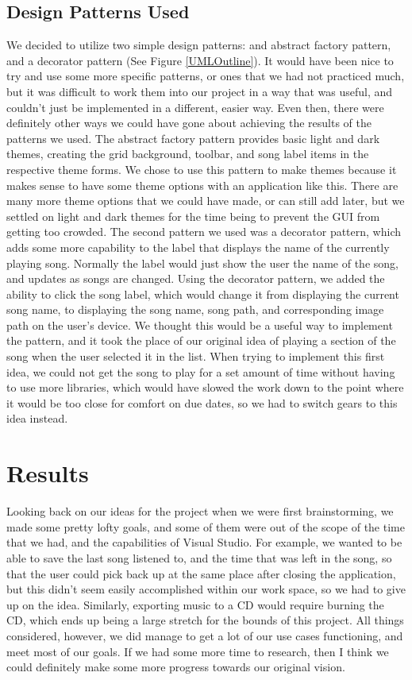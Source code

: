 \documentclass[10pt,conference,onecolumn,compsoc]{IEEEtran}
\begin{document}
\subsection{Design Patterns Used}
We decided to utilize two simple design patterns: and abstract factory pattern, and a decorator pattern (See Figure \ref{UMLOutline}). It would have been nice to try and use some more specific patterns, or ones that we had not practiced much, but it was difficult to work them into our project in a way that was useful, and couldn't just be implemented in a different, easier way. Even then, there were definitely other ways we could have gone about achieving the results of the patterns we used.
The abstract factory pattern provides basic light and dark themes, creating the grid background, toolbar, and song label items in the respective theme forms. We chose to use this pattern to make themes because it makes sense to have some theme options with an application like this. There are many more theme options that we could have made, or can still add later, but we settled on light and dark themes for the time being to prevent the GUI from getting too crowded.
The second pattern we used was a decorator pattern, which adds some more capability to the label that displays the name of the currently playing song. Normally the label would just show the user the name of the song, and updates as songs are changed. Using the decorator pattern, we added the ability to click the song label, which would change it from displaying the current song name, to displaying the song name, song path, and corresponding image path on the user's device. 
We thought this would be a useful way to implement the pattern, and it took the place of our original idea of playing a section of the song when the user selected it in the list. When trying to implement this first idea, we could not get the song to play for a set amount of time without having to use more libraries, which would have slowed the work down to the point where it would be too close for comfort on due dates, so we had to switch gears to this idea instead.


\section{Results}
Looking back on our ideas for the project when we were first brainstorming, we made some pretty lofty goals, and some of them were out of the scope of the time that we had, and the capabilities of Visual Studio. For example, we wanted to be able to save the last song listened to, and the time that was left in the song, so that the user could pick back up at the same place after closing the application, but this didn't seem easily accomplished within our work space, so we had to give up on the idea. Similarly, exporting music to a CD would require burning the CD, which ends up being a large stretch for the bounds of this project. All things considered, however, we did manage to get a lot of our use cases functioning, and meet most of our goals. If we had some more time to research, then I think we could definitely make some more progress towards our original vision.
\end{document}
